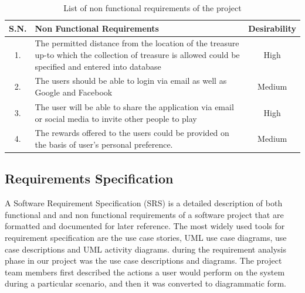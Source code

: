 \documentclass[12pt, a4paper, oneside]{article}
\begin{document}
\begin{table}[H]
\begin{tabularx}{\linewidth}{|c|X|c|}
\hline
\rowcolor[HTML]{C0C0C0} 
{\color[HTML]{000000} S.N.} & {\color[HTML]{000000} Non Functional Requirements}                                                                                                      & {\color[HTML]{000000} Desirability} \\ \hline
1.                          & The permitted distance from the location of the treasure up-to which the collection of treasure is allowed could be specified and entered into database & High                                \\ \hline
2.                          & The users should be able to login via email as well as Google and Facebook                                                                              & Medium                              \\ \hline
3.                          & The user will be able to share the application via email or social media to invite other people to play                                                 & High                                \\ \hline
4.                          & The rewards offered to the users could be provided on the basis of user's personal preference.                                                          & Medium                              \\ \hline
\end{tabularx}
\caption{List of non functional requirements of the project}
\label{table:nonfuncreq}
\end{table}


\subsection{Requirements Specification}
A Software Requirement Specification (SRS) is a detailed description of both functional and and non functional requirements of a software project that are formatted and documented for later reference. The most widely used tools for requirement specification are the use case stories, UML use case diagrams, use case descriptions and UML activity diagrams. during the requirement analysis phase in our project was the use case descriptions and diagrams. The project team members first described the actions a user would perform on the system during a particular scenario, and then it was converted to diagrammatic form. 
\end{document}
